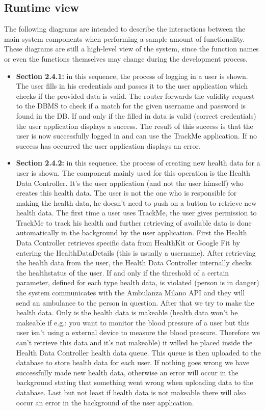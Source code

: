 \documentclass[12pt]{article}
\begin{document}
\subsection{Runtime view}
The following diagrams are intended to describe the interactions between the main system components when 
performing a sample amount of functionality. These diagrams are still a high-level view of the system, 
since the function names or even the functions themselves may change during the development process.

\begin{itemize}
    \item \textbf{Section 2.4.1:} in this sequence, the process of logging in a user is shown. The user fills in his credentials and passes it to the user application which checks if the provided data is valid. The router forwards the validity request to the DBMS to check if a match for the given username and password is found in the DB. If and only if the filled in data is valid (correct credentials) the user application displays a success. The result of this success is that the user is now successfully logged in and can use the TrackMe application. If no success has occurred the user application displays an error.
    \newpage 
    \item \textbf{Section 2.4.2:} in this sequence, the process of creating new health data for a user is shown. The component mainly used for this operation is the Health Data Controller. It's the user application (and not the user himself) who creates this health data. The user is not the one who is responsible for making the health data, he doesn't need to push on a button to retrieve new health data. The first time a user uses TrackMe, the user gives permission to TrackMe to track his health and further retrieving of available data is done automatically in the background by the user application. First the Health Data Controller retrieves specific data from HealthKit or Google Fit by entering the HealthDataDetails (this is usually a username). After retrieving the health data from the user, the Health Data Controller internally checks the healthstatus of the user. If and only if the threshold of a certain parameter, defined for each type health data, is violated (person is in danger) the system communicates with the Ambulanza Milano API and they will send an ambulance to the person in question. After that we try to make the health data. Only is the health data is makeable (health data won't be makeable if e.g.: you want to monitor the blood pressure of a user but this user isn't using a external device to measure the blood pressure. Therefore we can't retrieve this data and it's not makeable) it willed be placed inside the Health Data Controller health data queue. This queue is then uploaded to the database to store health data for each user. If nothing goes wrong we have successfully made new health data, otherwise an error will occur in the background stating that something went wrong when uploading data to the database. Last but not least if health data is not makeable there will also occur an error in the background of the user application.

\end{itemize}
\end{document}
